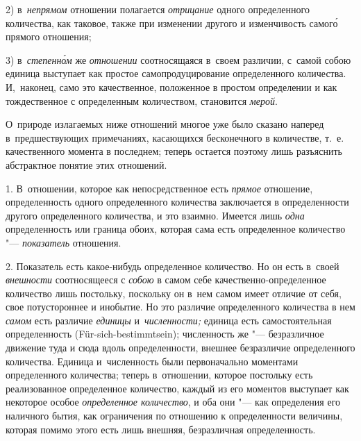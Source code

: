 2) в~{\em непрямом} отношении полагается {\em отрицание} одного определенного
количества, как таковое, также при изменении другого и изменчивость самог\'{о}
прямого отношения;

3) в~{\em степенн\'{о}м} же {\em отношении} соотносящаяся в~своем различии,
с~самой собою единица выступает как простое самопродуцирование определенного
количества. И,~наконец, само это качественное, положенное в простом определении
и как тождественное с определенным количеством, становится {\em мерой}.

О~природе излагаемых ниже отношений многое уже было сказано наперед
в~предшествующих примечаниях, касающихся бесконечного в количестве, т.~е.
качественного момента в последнем; теперь остается поэтому лишь разъяснить
абстрактное понятие этих отношений.


1. В~отношении, которое как непосредственное есть {\em прямое} отношение,
определенность одного определенного количества заключается в определенности
другого определенного количества, и это взаимно. Имеется лишь {\em одна}
определенность или граница обоих, которая сама есть определенное количество
"--- {\em показатель} отношения.

2. Показатель есть какое-нибудь определенное количество. Но он есть в~своей
{\em внешности} соотносящееся с {\em собою} в самом себе
качественно-определенное количество лишь постольку, поскольку он в~нем самом
имеет отличие от себя, свое потустороннее и инобытие. Но это различие
определенного количества в нем {\em самом} есть различие {\em единицы}
и~{\em численности;} единица есть самостоятельная определенность
(Für-sich-bestimmtsein); численность же "--- безразличное движение туда и сюда
вдоль определенности, внешнее безразличие определенного количества. Единица
и~численность были первоначально моментами определенного количества; теперь
в~отношении, которое постольку есть реализованное определенное количество,
каждый из его моментов выступает как некоторое особое {\em определенное
количество}, и оба они "--- как определения его наличного бытия, как
ограничения по отношению к определенности величины, которая помимо этого есть
лишь внешняя, безразличная определенность.


